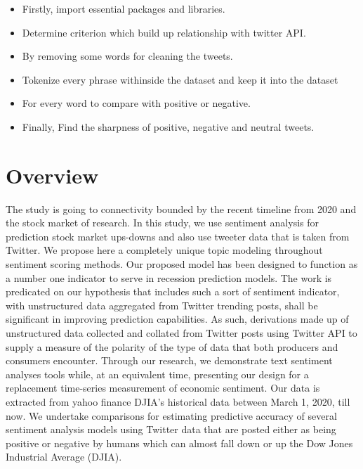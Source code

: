 \begin{itemize}
    \item Firstly, import essential packages and libraries.
    \item Determine criterion which build up relationship with twitter API. 
    \item By removing some words for cleaning the tweets.
    \item Tokenize every phrase withinside the dataset and keep it into the dataset
    \item For every word to compare with positive or negative.
    \item Finally, Find the sharpness of positive, negative and neutral tweets.
\end{itemize}


\section{Overview}
The study is going to connectivity bounded by the recent timeline from 2020 and the stock market of research. In this study, we use sentiment analysis for prediction stock market ups-downs and also use tweeter data that is taken from Twitter. We propose here a completely unique topic modeling throughout sentiment scoring methods. Our proposed model has been designed to function as a number one indicator to serve in recession prediction models. The work is predicated on our hypothesis that includes such a sort of sentiment indicator, with unstructured data aggregated from Twitter trending posts, shall be significant in improving prediction capabilities. As such, derivations made up of unstructured data collected and collated from Twitter posts using Twitter API to supply a measure of the polarity of the type of data that both producers and consumers encounter. Through our research, we demonstrate text sentiment analyses tools while, at an equivalent time, presenting our design for a replacement time-series measurement of economic sentiment. Our data is extracted from yahoo finance DJIA’s historical data between March 1, 2020, till now. We undertake comparisons for estimating predictive accuracy of several sentiment analysis models using Twitter data that are posted either as being positive or negative by humans which can almost fall down or up the Dow Jones Industrial Average (DJIA).\\


